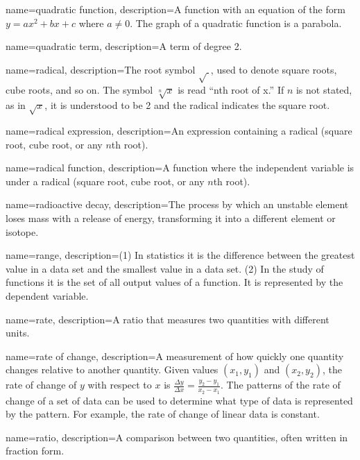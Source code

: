  {
	name=quadratic function,
	description={A function with an equation of the form $y = ax^2 + bx + c$ where $a \neq 0$. The graph of a quadratic function is a \gls{parabola}.}
}

 {
	name=quadratic term,
	description={A term of degree 2.}
}

 {
	name=radical,
	description={The root symbol $\sqrt{~}$, used to denote square roots, cube roots, and so on. The symbol $\sqrt[n]{x}$ is read ``nth root of x.'' If $n$ is not stated, as in $\sqrt{x}$, it is understood to be 2 and the radical indicates the square root.}
}

 {
	name=radical expression,
	description={An expression containing a radical (square root, cube root, or any $n$th root).}
}

 {
	name=radical function,
	description={A function where the independent variable is under a radical (square root, cube root, or any $n$th root).}
}

 {
	name=radioactive decay,
	description={The process by which an unstable element loses mass with a release of energy, transforming it into a different element or isotope.}
}

 {
	name=range,
	description={(1) In statistics it is the difference between the greatest value in a data set and the smallest value in a data set. (2) In the study of functions it is the set of all output values of a function. It is represented by the dependent variable.}
}

 {
	name=rate,
	description={A \gls{ratio} that measures two quantities with different units.}
}

 {
	name=rate of change,
	description={A measurement of how quickly one quantity changes relative to another quantity. Given values $(x_1,y_1)$ and $(x_2,y_2)$, the rate of change of $y$ with respect to $x$ is $\frac{\Delta y}{\Delta x} = \frac{y_2-y_1}{x_2-x_1}$. The patterns of the rate of change of a set of data can be used to determine what type of data is represented by the pattern. For example, the rate of change of linear data is constant.}
}

 {
	name=ratio,
	description={A comparison between two quantities, often written in fraction form.}
}

